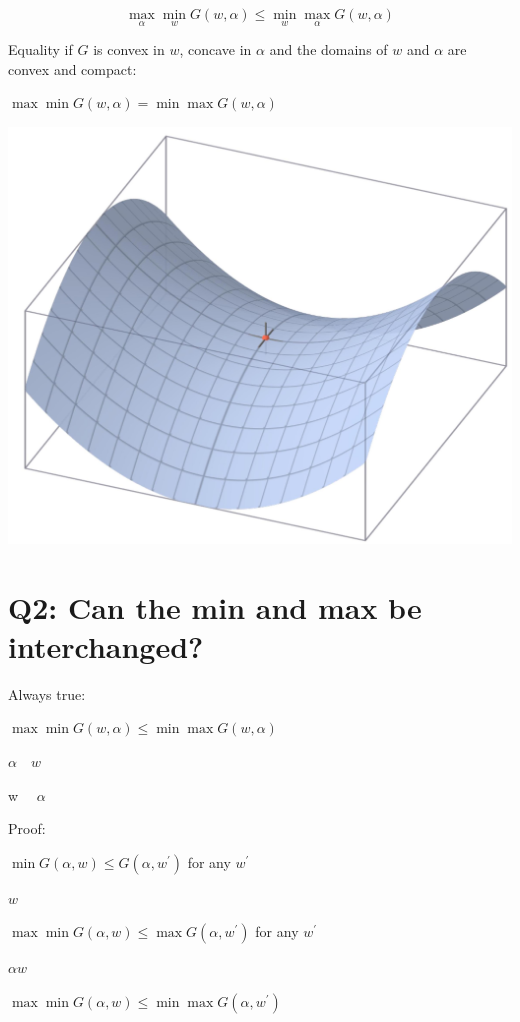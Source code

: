 \documentclass[10pt]{article}
\begin{document}
$$
\max _{\alpha} \min _{w} G(w, \alpha) \leq \min _{w} \max _{\alpha} G(w, \alpha)
$$

Equality if $G$ is convex in $w$, concave in $\alpha$ and the domains of $w$ and $\alpha$ are convex and compact:

$\max \min G(w, \alpha)=\min \max G(w, \alpha)$

\begin{center}
\includegraphics[max width=\textwidth]{2023_12_30_bf5d191916c1e78fa6d6g-17}
\end{center}

\section*{Q2: Can the min and max be interchanged?}
Always true:

$\max \min G(w, \alpha) \leq \min \max G(w, \alpha)$

$\alpha \quad w$

w $\quad \alpha$

Proof:

$\min G(\alpha, w) \leq G\left(\alpha, w^{\prime}\right)$ for any $w^{\prime}$

$w$

$\max \min G(\alpha, w) \leq \max G\left(\alpha, w^{\prime}\right)$ for any $w^{\prime}$

$\alpha w$

$\max \min G(\alpha, w) \leq \min \max G\left(\alpha, w^{\prime}\right)$
\end{document}
